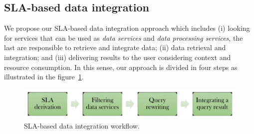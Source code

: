 \subsection{SLA-based data integration}
We propose our SLA-based data integration approach which includes (i) looking for services that can be used as \textit{data services} and \textit{data processing services}, the last are responsible to retrieve and integrate data; (ii) data retrieval and integration; and (iii) delivering results to the user considering context and resource consumption.  In this sense, our approach is divided in four steps as illustrated in the figure~\ref{fig:generalapproach}. 
\begin{figure}[h!]
\centering
\includegraphics[scale=0.4]{workflow-approach.pdf}
\caption{SLA-based data integration workflow.}
\label{fig:generalapproach}
\end{figure}

